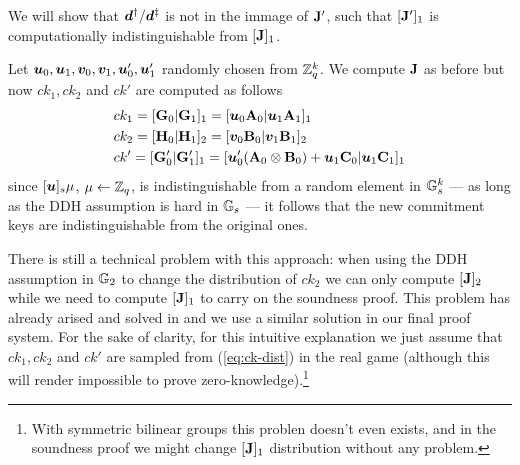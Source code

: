 We will show that ${\boldsymbol{d}}^\dag/ {\boldsymbol{d}}^\ddag$ is not in the immage of $\mathbf{{J}}'$, such that $[\mathbf{{J}}']_1$ is computationally indistinguishable from $[\mathbf{{J}}]_1$.

Let ${\boldsymbol{u}}_0,{\boldsymbol{u}}_1,{\boldsymbol{v}}_0,{\boldsymbol{v}}_1,{\boldsymbol{u}}'_0,{\boldsymbol{u}}'_1$ randomly chosen from $\mathbb{Z}_q^k$. We compute $\mathbf{{J}}$ as before but now $ck_1,ck_2$ and $ck'$ are computed as follows
\begin{align}
&ck_1 = [\mathbf{{G}}_0|\mathbf{{G}}_1]_1 = [{\boldsymbol{u}}_0\mathbf{{A}}_{0}|{\boldsymbol{u}}_1\mathbf{{A}}_1]_1 \nonumber \\
&ck_2 = [\mathbf{{H}}_0|\mathbf{{H}}_1]_2 = [{\boldsymbol{v}}_0\mathbf{{B}}_{0}|{\boldsymbol{v}}_1\mathbf{{B}}_1]_2 \nonumber \\
&ck' =  [\mathbf{{G}}'_0|\mathbf{{G}}'_1]_1 = [{\boldsymbol{u}}'_0(\mathbf{{A}}_0\otimes\mathbf{{B}}_0) + {\boldsymbol{u}}_1\mathbf{{C}}_0|{\boldsymbol{u}}_1\mathbf{{C}}_1]_1 \label{eq:ck-dist}
\end{align}
since $[{\boldsymbol{u}}]_s\mu$, $\mu\gets \mathbb{Z}_q$, is indistinguishable from a random element in $\mathbb{G}_s^k$ --- as long as the DDH assumption is hard in $\mathbb{G}_s$ --- it follows that the new commitment keys are indistinguishable from the original ones.

There is still a technical problem with this approach: when using the DDH assumption in $\mathbb{G}_2$ to change the distribution of $ck_2$ we can only compute $[\mathbf{{J}}]_2$ while we need to compute $[\mathbf{{J}}]_1$ to carry on the soundness proof. This problem has already arised and solved in \cite{AC:GonHevRaf15} and we use a similar solution in our final proof system. For the sake of clarity, for this intuitive explanation we just assume that $ck_1,ck_2$ and $ck'$ are sampled from (\ref{eq:ck-dist}) in the real game (although this will render impossible to prove zero-knowledge).\footnote{With symmetric bilinear groups this problen doesn't even exists, and in the soundness proof we might change $[\mathbf{{J}}]_1$ distribution without any problem.}

